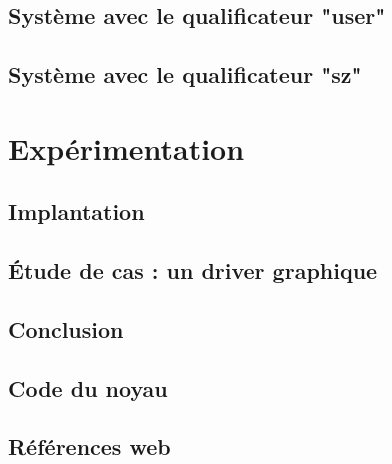 \documentclass[a4paper,11pt]{memoir}
\begin{document}
\label{cha:typbase}


\chapter{Système avec le qualificateur "user"}

\label{cha:qualuser}


\chapter{Système avec le qualificateur "sz"}



\part{Expérimentation}

\chapter{Implantation}

\label{cha:implem}


\chapter{Étude de cas : un driver graphique}


\chapter{Conclusion}



\appendix

\chapter{Code du noyau}

\label{cha:code-noyau}


\backmatter


\listoftodos

\clearpage

\listoffigures

\chapter{Références web}

\insertlinks



\end{document}
